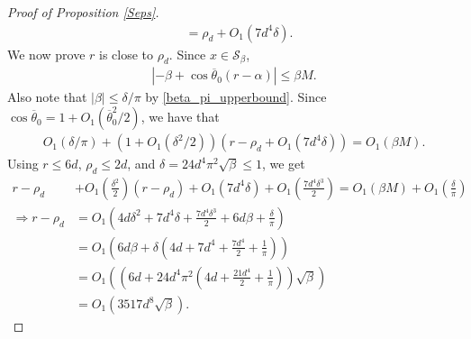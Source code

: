 \documentclass[11pt]{article}
\newcommand{\al}{\alpha}
\newcommand{\Seps}{\mathcal{S}}
\theoremstyle{remark}
\begin{document}
\begin{proof}[Proof of Proposition \ref{Seps}]
\begin{align*}
& = \rho_d + O_1(7d^4\delta).
\end{align*} We now prove $r$ is close to $\rho_d$. Since $x \in \Seps_{\beta}$, \begin{align*}
|-\beta + \cos \overline{\theta}_0(r - \al)|\leqslant \beta M.
\end{align*} Also note that $|\beta| \leqslant \delta/\pi$ by \eqref{beta_pi_upperbound}. Since $\cos \overline{\theta}_0 = 1 + O_1(\overline{\theta}_0^2/2)$, we have that \begin{align*}
O_1(\delta/\pi) + (1 + O_1(\delta^2/2))(r - \rho_d + O_1(7d^4\delta)) = O_1(\beta M).
\end{align*} Using $r \leqslant 6d$, $\rho_d \leqslant 2d$, and $\delta = 24d^4\pi^2\sqrt{\beta} \leqslant 1$, we get \begin{align*}
r - \rho_d & + O_1 \left(\frac{\delta^2}{2}\right)( r - \rho_d) + O_1(7d^4 \delta) + O_1\left(\frac{7d^4\delta^3}{2}\right) = O_1(\beta M) + O_1 \left(\frac{\delta}{\pi}\right)  \\
\Longrightarrow r - \rho_d & = O_1\left(4d\delta^2 + 7d^4\delta + \frac{7d^4\delta^3}{2} + 6d\beta + \frac{\delta}{\pi}\right) \\
& = O_1\left(6d\beta + \delta\left(4d + 7d^4 + \frac{7d^4}{2} + \frac{1}{\pi}\right)\right) \\
& = O_1\left(\left(6d + 24d^4\pi^2\left(4d + \frac{21d^4}{2} + \frac{1}{\pi}\right)\right)\sqrt{\beta}\right) \\
& = O_1(3517d^8\sqrt{\beta}).
\end{align*}


\end{proof}
\end{document}
